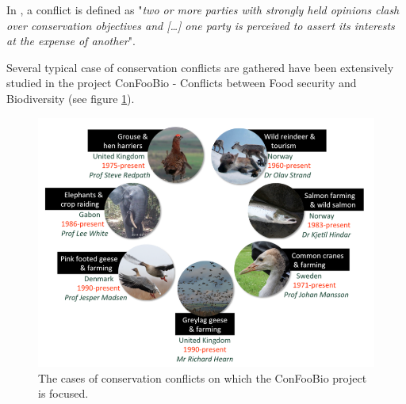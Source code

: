 \documentclass[12pt,a4paper]{article}
\begin{document}
In \cite{redpath2013understanding}, a conflict is defined as "\textit{two or more parties with strongly held opinions clash over conservation objectives and [\dots] one party is perceived to assert its interests at the expense of another}".

Several typical case of conservation conflicts are gathered have been extensively studied in the project ConFooBio - Conflicts between Food security and Biodiversity (see figure \ref{confoobio}).
\begin{figure}
	\centering
	\includegraphics[scale=0.5]{confoobio-cases.png}
	\caption{The cases of conservation conflicts on which the ConFooBio project is focused.}
	\label{confoobio}
\end{figure}
\end{document}

